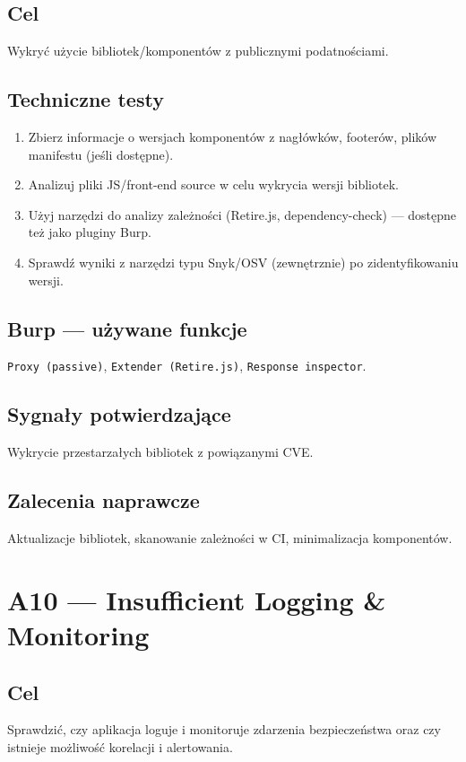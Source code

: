 \documentclass[11pt,a4paper]{article}
\begin{document}
	\subsection*{Cel}
	Wykryć użycie bibliotek/komponentów z publicznymi podatnościami.
	
	\subsection*{Techniczne testy}
	\begin{enumerate}[leftmargin=*,label=\arabic*)]
		\item Zbierz informacje o wersjach komponentów z nagłówków, footerów, plików manifestu (jeśli dostępne).
		\item Analizuj pliki JS/front-end source w celu wykrycia wersji bibliotek.
		\item Użyj narzędzi do analizy zależności (Retire.js, dependency-check) — dostępne też jako pluginy Burp.
		\item Sprawdź wyniki z narzędzi typu Snyk/OSV (zewnętrznie) po zidentyfikowaniu wersji.
	\end{enumerate}
	
	\subsection*{Burp --- używane funkcje}
	\texttt{Proxy (passive)}, \texttt{Extender (Retire.js)}, \texttt{Response inspector}.
	
	\subsection*{Sygnały potwierdzające}
	Wykrycie przestarzałych bibliotek z powiązanymi CVE.
	
	\subsection*{Zalecenia naprawcze}
	Aktualizacje bibliotek, skanowanie zależności w CI, minimalizacja komponentów.
	
	\newpage
	\section{A10 --- Insufficient Logging \& Monitoring}
	\subsection*{Cel}
	Sprawdzić, czy aplikacja loguje i monitoruje zdarzenia bezpieczeństwa oraz czy istnieje możliwość korelacji i alertowania.
	
\end{document}
